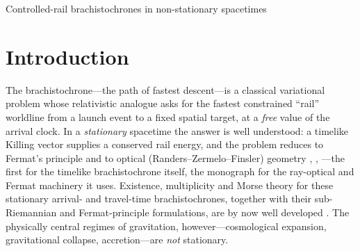 \documentclass[12pt]{iopart}
\theoremstyle{plain}
\theoremstyle{definition}
\theoremstyle{plain}
\theoremstyle{remark}
\begin{document}
\maketitle
%
         {Controlled-rail brachistochrones in non-stationary spacetimes}

\section{Introduction}
\label{sec:intro}
The brachistochrone---the path of fastest descent---is a classical variational problem
whose relativistic analogue asks for the fastest constrained ``rail'' worldline from a
launch event to a fixed spatial target, at a \emph{free} value of the arrival clock. In a
\emph{stationary} spacetime the answer is well understood: a timelike Killing vector
supplies a conserved rail energy, and the problem reduces to Fermat's principle and to
optical (Randers--Zermelo--Finsler) geometry
\cite{Perlick1991}, \cite[\S\S6.5--6.6,~7.3]{PerlickRayOptics},
\cite{Randers1941,GibbonsWerner2008,GibbonsRanders2009,BaoRoblesShen}---the first
for the timelike brachistochrone itself, the monograph for the ray-optical and
Fermat machinery it uses.
Existence, multiplicity and Morse theory for these stationary arrival- and travel-time
brachistochrones, together with their sub-Riemannian and Fermat-principle formulations,
are by now well developed
\cite{GiannoniPiccioneVerderesi1997,GiannoniPiccioneTausk2002,GiannoniPiccione2002,CaponioJavaloyes2026}.
The physically central regimes of gravitation, however---cosmological expansion,
gravitational collapse, accretion---are \emph{not} stationary.
\end{document}
